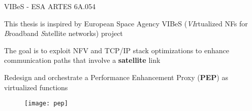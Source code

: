 \begin{frame}{VIBeS - ESA ARTES  6A.054}

  This thesis is inspired by European Space Agency VIBeS (\emph{VI}rtualized
  NFs for \emph{B}roadband \emph{S}atellite networks) project

  \vfill{}

  The goal is to exploit NFV and TCP/IP stack optimizations to enhance
  communication paths that involve a \textbf{satellite} link

  \vfill{}

  Redesign and orchestrate a Performance Enhancement Proxy (\textbf{PEP}) as
  virtualized functions

  \vfill{}

  \begin{figure}
    \centering
    \texttt{[image: pep]}
  \end{figure}

\end{frame}